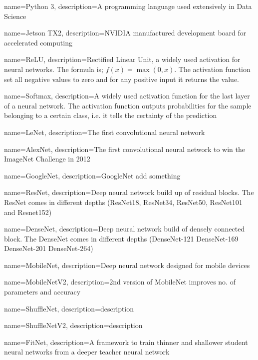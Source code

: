 {
	name=Python 3,
	description={A programming language used extensively in Data Science}
}

{
	name=Jetson TX2,
	description={NVIDIA manufactured development board for accelerated computing}
}


{
	name=ReLU,
	description={Rectified Linear Unit, a widely used activation for neural networks. The formula is; $f(x)=\max(0,x)$. The activation function set all negative values to zero and for any positive input it returns the value.}
}

{
	name=Softmax,
	description={A widely used activation function for the last layer of a neural network. The activation function outputs probabilities for the sample belonging to a certain class, i.e. it tells the certainty of the prediction}
}

{
	name={LeNet},
	description={The first convolutional neural network}
}

{
	name={AlexNet},
	description={The first convolutional neural network to win the ImageNet Challenge in 2012}
}

{
	name={GoogleNet},
	description={GoogleNet add something}
}

{
	name={ResNet},
	description={Deep neural network build up of residual blocks. The ResNet comes in different depths (ResNet18, ResNet34, ResNet50, ResNet101 and Resnet152)}
}

{
	name={DenseNet},
	description={Deep neural network build of densely connected block. The DenseNet comes in different depths (DenseNet-121 DenseNet-169 DenseNet-201 DenseNet-264)}
}

{
	name={MobileNet},
	description={Deep neural network designed for mobile devices}
}

{
	name={MobileNetV2},
	description={2nd version of MobileNet improves no. of parameters and accuracy}
}

{
	name={ShuffleNet},
	description={description}
}

{
	name={ShuffleNetV2},
	description={description}
}

{
	name={FitNet},
	description={A framework to train thinner and shallower student neural networks from a deeper teacher neural network}
}


